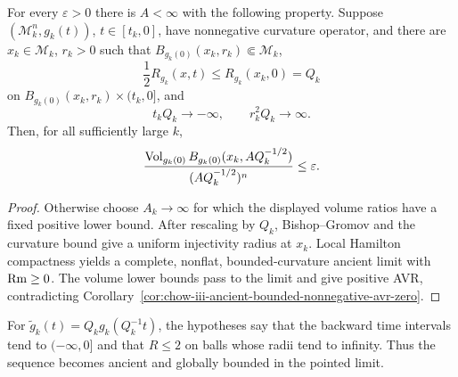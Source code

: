\begin{proposition}
\label{prop:chow-iii-almost-ancient-large-scale-collapse}
For every $\varepsilon>0$ there is $A<\infty$ with the following property.
Suppose $(\mathcal M_k^n,g_k(t))$, $t\in[t_k,0]$, have nonnegative curvature
operator, and there are $x_k\in\mathcal M_k$, $r_k>0$ such that
$B_{g_k(0)}(x_k,r_k)\Subset\mathcal M_k$,
\[
 \frac12R_{g_k}(x,t)\le R_{g_k}(x_k,0)=Q_k
\]
on $B_{g_k(0)}(x_k,r_k)\times(t_k,0]$, and
\[
 t_kQ_k\longrightarrow-\infty,
 \qquad r_k^2Q_k\longrightarrow\infty.
\]
Then, for all sufficiently large $k$,
\[
 \frac{\operatorname{Vol}_{g_k(0)}B_{g_k(0)}(x_k,AQ_k^{-1/2})}
 {(AQ_k^{-1/2})^n}\le\varepsilon.
\]
\end{proposition}
\begin{proof}
Otherwise choose $A_k\to\infty$ for which the displayed volume ratios have a
fixed positive lower bound.  After rescaling by $Q_k$, Bishop--Gromov and the
curvature bound give a uniform injectivity radius at $x_k$.  Local Hamilton
compactness yields a complete, nonflat, bounded-curvature ancient limit with
$\operatorname{Rm}\ge0$.  The volume lower bounds pass to the limit and give positive AVR,
contradicting Corollary~\ref{cor:chow-iii-ancient-bounded-nonnegative-avr-zero}.
\end{proof}

\begin{remark}
\label{rem:chow-iii-almost-ancient-rescaling}
For $\widetilde g_k(t)=Q_kg_k(Q_k^{-1}t)$, the hypotheses say that the
backward time intervals tend to $(-\infty,0]$ and that $R\le2$ on balls whose
radii tend to infinity.  Thus the sequence becomes ancient and globally
bounded in the pointed limit.
\end{remark}

